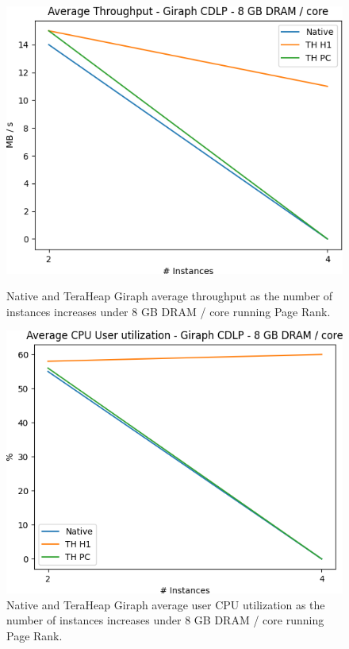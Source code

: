 \begin{figure}[thbp]
        \centering
        \includegraphics[width=\linewidth]{./fig/G_CDLP_128_THR.png}
    \caption{Native and TeraHeap Giraph average throughput
        as the number of instances increases under 8 GB DRAM / core running Page Rank.}
                \label{fig:g_cdlp_128_thr}
        \includegraphics[width=\linewidth]{./fig/G_CDLP_128_USR.png}
    \caption{Native and TeraHeap Giraph average user CPU utilization
        as the number of instances increases under 8 GB DRAM / core running Page Rank.}
        \label{fig:g_cdlp_128_usr}
\end{figure}

